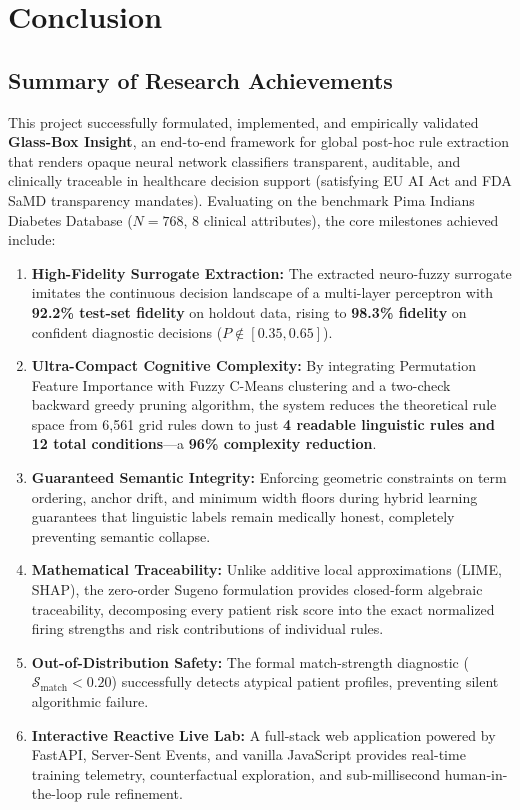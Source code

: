 \documentclass{report}
\begin{document}
\chapter{Conclusion}

\section{Summary of Research Achievements}

This project successfully formulated, implemented, and empirically validated \textbf{Glass-Box Insight}, an end-to-end framework for global post-hoc rule extraction that renders opaque neural network classifiers transparent, auditable, and clinically traceable in healthcare decision support (satisfying EU AI Act and FDA SaMD transparency mandates). Evaluating on the benchmark Pima Indians Diabetes Database ($N=768$, 8 clinical attributes), the core milestones achieved include:
\begin{enumerate}
    \setlength{\itemsep}{0pt}
    \setlength{\parskip}{0pt}
    \item \textbf{High-Fidelity Surrogate Extraction:} The extracted neuro-fuzzy surrogate imitates the continuous decision landscape of a multi-layer perceptron with \textbf{92.2\% test-set fidelity} on holdout data, rising to \textbf{98.3\% fidelity} on confident diagnostic decisions ($P \notin [0.35, 0.65]$).
    \item \textbf{Ultra-Compact Cognitive Complexity:} By integrating Permutation Feature Importance with Fuzzy C-Means clustering and a two-check backward greedy pruning algorithm, the system reduces the theoretical rule space from 6,561 grid rules down to just \textbf{4 readable linguistic rules and 12 total conditions}—a \textbf{96\% complexity reduction}.
    \item \textbf{Guaranteed Semantic Integrity:} Enforcing geometric constraints on term ordering, anchor drift, and minimum width floors during hybrid learning guarantees that linguistic labels remain medically honest, completely preventing semantic collapse.
    \item \textbf{Mathematical Traceability:} Unlike additive local approximations (LIME, SHAP), the zero-order Sugeno formulation provides closed-form algebraic traceability, decomposing every patient risk score into the exact normalized firing strengths and risk contributions of individual rules.
    \item \textbf{Out-of-Distribution Safety:} The formal match-strength diagnostic ($\mathcal{S}_{\text{match}} < 0.20$) successfully detects atypical patient profiles, preventing silent algorithmic failure.
    \item \textbf{Interactive Reactive Live Lab:} A full-stack web application powered by FastAPI, Server-Sent Events, and vanilla JavaScript provides real-time training telemetry, counterfactual exploration, and sub-millisecond human-in-the-loop rule refinement.
\end{enumerate}
\end{document}

